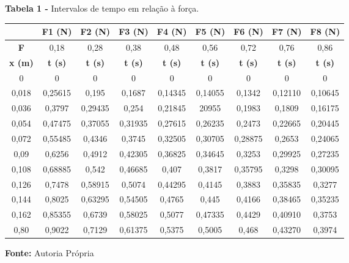 \documentclass[article,12pt,oneside,a4paper,brazil]{abntex2}
\begin{document}
	
	\begin{table}[h!]
		\centering
		\begin{adjustwidth}{0cm}{0cm}
			\begin{flushleft}
				\textbf{Tabela 1 -} Intervalos de tempo em relação à força.
			\end{flushleft}
		\end{adjustwidth}
		
		\label{tab:intervalos-forca}
		\begin{tabular}{|c|c|c|c|c|c|c|c|c|}
			\hline
			& \textbf{F1 (N)} & \textbf{F2 (N)} & \textbf{F3 (N)} & \textbf{F4 (N)} & \textbf{F5 (N)} & \textbf{F6 (N)} & \textbf{F7 (N)} & \textbf{F8 (N)} \\ \hline
			\textbf{F } & 0,18 & 0,28 & 0,38 & 0,48 & 0,56 & 0,72 & 0,76 & 0,86 \\ \hline
			\textbf{x (m)} & \textbf{t (s)} & \textbf{t (s)} & \textbf{t (s)} & \textbf{t (s)} & \textbf{t (s)} & \textbf{t (s)} & \textbf{t (s)} & \textbf{t (s)} \\ \hline
			0 & 0 & 0 & 0 & 0 & 0 & 0 & 0 & 0 \\ \hline
			0,018 & 0,25615 & 0,195 & 0,1687 & 0,14345 & 0,14055 & 0,1342 & 0,12110 & 0,10645 \\ \hline
			0,036 & 0,3797 & 0,29435 & 0,254 & 0,21845 & 20955 & 0,1983 & 0,1809 & 0,16175 \\ \hline
			0,054 & 0,47475 & 0,37055 & 0,31935 & 0,27615 & 0,26235 & 0,2473 & 0,22665 & 0,20445 \\ \hline
			0,072 & 0,55485 & 0,4346 & 0,3745 & 0,32505 & 0,30705 & 0,28875 & 0,2653 & 0,24065 \\ \hline
			0,09 & 0,6256 & 0,4912 & 0,42305 & 0,36825 & 0,34645 & 0,3253 & 0,29925 & 0,27235 \\ \hline
			0,108 & 0,68885 & 0,542 & 0,46685 & 0,407 & 0,3817 & 0,35795 & 0,3298 & 0,30095 \\ \hline
			0,126 & 0,7478 & 0,58915 & 0,5074 & 0,44295 & 0,4145 & 0,3883 & 0,35835 & 0,3277 \\ \hline
			0,144 & 0,8025 & 0,63295 & 0,54505 & 0,4765 & 0,445 & 0,4166 & 0,38465 & 0,35235 \\ \hline
			0,162 & 0,85355 & 0,6739 & 0,58025 & 0,5077 & 0,47335 & 0,4429 & 0,40910 & 0,3753 \\ \hline
			0,80 & 0,9022 & 0,7129 & 0,61375 & 0,5375 & 0,5005 & 0,468 & 0,43270 & 0,3974 \\ \hline
		\end{tabular}
		
		\begin{adjustwidth}{0cm}{0cm}
			\begin{flushleft}
				\textbf{Fonte: }Autoria Própria
			\end{flushleft}
		\end{adjustwidth}
	\end{table}
	
\end{document}
